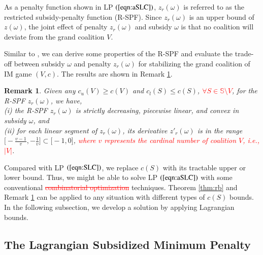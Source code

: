 \documentclass[authoryear,review,12pt]{elsarticle}
\newtheorem{remark}{Remark}
\begin{document}
As a penalty function shown in LP $(\ref{eqn:aSLC})$, $z_r(\omega)$ is referred to as the restricted subsidy-penalty function (R-SPF).
Since $z_r(\omega)$ is an upper bound of $z(\omega)$, the joint effect of penalty $z_r(\omega)$ and subsidy $\omega$ is that no coalition will deviate from the grand coalition $V$.


Similar to \cite{leastcore2018}, we can derive some properties of the R-SPF and evaluate the trade-off between subsidy $\omega$ and penalty $z_r(\omega)$ for stabilizing the grand coalition of IM game $(V,c)$.
The results are shown in Remark \ref{rem:convex}.

\begin{remark}\label{rem:convex}
Given any $c_u(V) \geq c(V)$ and $c_l(S) \leq c(S)$, \textcolor{red}{$\forall S \in \mathbb{S} \setminus V$}, for the R-SPF $z_r(\omega)$, we have,\\
(i) the R-SPF $z_r(\omega)$ is strictly decreasing, piecewise linear, and convex in subsidy $\omega$, and\\
(ii) for each linear segment of $z_r(\omega)$, its derivative $z'_r(\omega)$ is in the range $\big[ -\frac{v-1}{v}, -\frac{1}{v} \big] \subset \big[-1,0\big]$, \textcolor{red}{where $v$ represents the cardinal number of coalition $V$, i.e., $|V|$}.
\end{remark}


Compared with LP $(\ref{eqn:SLC})$, we replace $c(S)$ with its tractable upper or lower bound. Thus, we might be able to solve LP $(\ref{eqn:aSLC})$ with some conventional
\textcolor{red}{\st{combinatorial optimization}}
techniques.
Theorem \ref{thm:rb} and Remark \ref{rem:convex} can be applied to any situation with different types of $c(S)$ bounds.
In the following subsection, we develop a solution by applying Lagrangian bounds.


\subsection{The Lagrangian Subsidized Minimum Penalty}\label{section:CGBAM}
\end{document}
